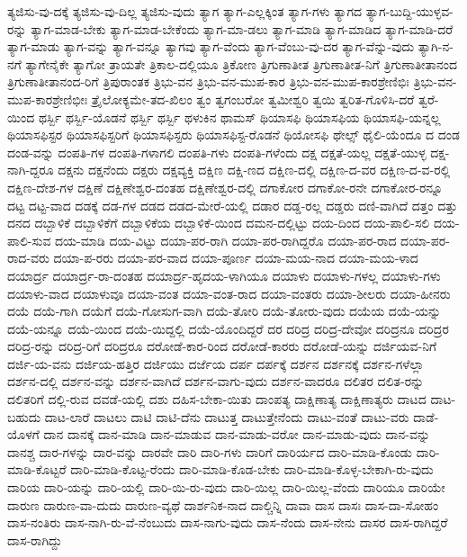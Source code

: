 {ತ್ಯಜಿಸು-ವು-ದಕ್ಕೆ
ತ್ಯಜಿಸು-ವು-ದಿಲ್ಲ
ತ್ಯಜಿಸು-ವುದು
ತ್ಯಾಗ
ತ್ಯಾಗ-ಎಲ್ಲಕ್ಕಿಂತ
ತ್ಯಾಗ-ಗಳು
ತ್ಯಾಗದ
ತ್ಯಾಗ-ಬುದ್ದಿ-ಯುಳ್ಳವ-ರನ್ನು
ತ್ಯಾಗ-ಮಾಡ-ಬೇಕು
ತ್ಯಾಗ-ಮಾಡ-ಬೇಕೆಂದು
ತ್ಯಾಗ-ಮಾ-ಡಲು
ತ್ಯಾಗ-ಮಾಡಿ
ತ್ಯಾಗ-ಮಾಡಿದ
ತ್ಯಾಗ-ಮಾಡಿ-ದರೆ
ತ್ಯಾಗ-ಮಾಡು
ತ್ಯಾಗ-ವನ್ನು
ತ್ಯಾಗ-ವನ್ನೂ
ತ್ಯಾಗವು
ತ್ಯಾಗ-ವೆಂದು
ತ್ಯಾಗ-ವೆಂಬು-ವು-ದರ
ತ್ಯಾಗ-ವೆನ್ನು-ವುದು
ತ್ಯಾಗಿ-ನ-ನಗೆ
ತ್ಯಾಗೇನೈಕೇ
ತ್ಯಾಗೋ
ತ್ರಾಯತೇ
ತ್ರಿಕಾಲ-ದಲ್ಲಿಯೂ
ತ್ರಿಕೋಣ
ತ್ರಿಗುಣಾತೀತ
ತ್ರಿಗುಣಾತೀತ-ನಿಗೆ
ತ್ರಿಗುಣಾತೀತಾನಂದ
ತ್ರಿಗುಣಾತೀತಾನಂದ-ರಿಗೆ
ತ್ರಿಪುರಾಂತಕ
ತ್ರಿಭು-ವನ
ತ್ರಿಭು-ವನ-ಮುಪ-ಕಾರ
ತ್ರಿಭು-ವನ-ಮುಪ-ಕಾರಶ್ರೇಣಿಭಿಃ
ತ್ರಿಭು-ವನ-ಮುಪ-ಕಾರಶ್ರೇಣಿಭೀಃ
ತ್ರೈಲೋಕ್ಯಮೇ-ತದ-ಖಿಲಂ
ತ್ವಂ
ತ್ವಗಂಬರೋ
ತ್ವಮೀಶ್ವರಿ
ತ್ವಯಿ
ತ್ವರಿತ-ಗೊಳಿಸಿ-ದರೆ
ತ್ವರೆ-ಯಿಂದ
ಥರ್ಸ್ಬಿ
ಥರ್ಸ್ಬಿ-ಯೊಡನೆ
ಥರ್ಸ್ಬಿ
ಥರ್ಸ್ಬಿ
ಥಳುಕಿನ
ಥಾಮಸ್
ಥಿಯಾಸಫಿ
ಥಿಯಾಸಫಿಯ
ಥಿಯಾಸಫಿ-ಯನ್ನಲ್ಲ
ಥಿಯಾಸಫಿಸ್ಟರ
ಥಿಯಾಸಫಿಸ್ಟರಿಗೆ
ಥಿಯಾಸಫಿಸ್ಟರು
ಥಿಯಾಸಫಿಸ್ಟ-ರೊಡನೆ
ಥಿಯೋಸಫಿ
ಥೇಲ್ಸ್
ಥೈಲಿ-ಯೆಂದೂ
ದ
ದಂಡ
ದಂಡ-ವನ್ನು
ದಂಪತಿ-ಗಳ
ದಂಪತಿ-ಗಳಾಗಲಿ
ದಂಪತಿ-ಗಳು
ದಂಪತಿ-ಗಳೆಂದು
ದಕ್ಷ
ದಕ್ಷತೆ-ಯಲ್ಲ
ದಕ್ಷತೆ-ಯುಳ್ಳ
ದಕ್ಷ-ನಾಗಿ-ದ್ದರೂ
ದಕ್ಷನು
ದಕ್ಷನೆಂದು
ದಕ್ಷರು
ದಕ್ಷವ್ಯಕ್ತಿ
ದಕ್ಷಿಣ
ದಕ್ಷಿ-ಣದ
ದಕ್ಷಿಣ-ದಲ್ಲಿ
ದಕ್ಷಿಣ-ದ-ವರ
ದಕ್ಷಿಣ-ದ-ವ-ರಲ್ಲಿ
ದಕ್ಷಿಣ-ದೇಶ-ಗಳ
ದಕ್ಷಿಣೆ
ದಕ್ಷಿಣೇಶ್ವರ-ದಂತಹ
ದಕ್ಷಿಣೇಶ್ವರ-ದಲ್ಲಿ
ದಗಾಕೋರ
ದಗಾಕೋ-ರನೇ
ದಗಾಕೋರ-ರನ್ನೂ
ದಟ್ಟ
ದಟ್ಟ-ವಾದ
ದಡಕ್ಕೆ
ದಡ-ಗಳ
ದಡದ
ದಡದ-ಮೇರೆ-ಯಲ್ಲಿ
ದಡಾರ
ದಡ್ಡ-ರಲ್ಲ
ದಡ್ಡರು
ದಣಿ-ವಾಗಿದೆ
ದತ್ತಂ
ದತ್ತು
ದನದ
ದಬ್ಬಾಳಿಕೆ
ದಬ್ಬಾಳಿಕೆಗೆ
ದಬ್ಬಾಳಿಕೆಯ
ದಬ್ಬಾಳಿಕೆ-ಯಿಂದ
ದಮನ-ದಲ್ಲಿಟ್ಟು
ದಯ-ದಿಂದ
ದಯ-ಪಾಲಿ-ಸಲಿ
ದಯ-ಪಾಲಿ-ಸುವ
ದಯ-ಮಾಡಿ
ದಯ-ವಿಟ್ಟು
ದಯಾ-ಪರ-ರಾಗಿ
ದಯಾ-ಪರ-ರಾಗಿದ್ದರೊ
ದಯಾ-ಪರ-ರಾದ
ದಯಾ-ಪರ-ರಾದ-ವರು
ದಯಾ-ಪ-ರರು
ದಯಾ-ಪರ-ವಾದ
ದಯಾ-ಪೂರ್ಣ
ದಯಾ-ಮಯ-ನಾದ
ದಯಾ-ಮಯ-ಳಾದ
ದಯಾರ್ದ್ರ
ದಯಾರ್ದ್ರ-ರಾ-ದಂತಹ
ದಯಾರ್ದ್ರ-ಹೃದಯ-ಳಾಗಿಯೂ
ದಯಾಳು
ದಯಾಳು-ಗಳಲ್ಲ
ದಯಾಳು-ಗಳು
ದಯಾಳು-ವಾದ
ದಯಾಳುವೂ
ದಯಾ-ವಂತ
ದಯಾ-ವಂತ-ರಾದ
ದಯಾ-ವಂತರು
ದಯಾ-ಶೀಲರು
ದಯಾ-ಹೀನರು
ದಯೆ
ದಯೆ-ಗಾಗಿ
ದಯೆಗೆ
ದಯೆ-ಗೋಸುಗ-ವಾಗಿ
ದಯೆ-ತೋರಿ
ದಯೆ-ತೋರು-ವುದು
ದಯೆಯ
ದಯೆ-ಯನ್ನು
ದಯೆ-ಯನ್ನೂ
ದಯೆ-ಯಿಂದ
ದಯೆ-ಯಿದ್ದಲ್ಲಿ
ದಯೆ-ಯೊಂದಿದ್ದರೆ
ದರ
ದರಿದ್ರ
ದರಿದ್ರ-ದೇವೋ
ದರಿದ್ರನೂ
ದರಿದ್ರರ
ದರಿದ್ರ-ರನ್ನು
ದರಿದ್ರ-ರಿಗೆ
ದರಿದ್ರರೂ
ದರೋಡೆ-ಕಾರ-ರಿಂದ
ದರೋಡೆ-ಕಾರರು
ದರೋಡೆ-ಯನ್ನು
ದರ್ಜಿಯವ-ನಿಗೆ
ದರ್ಜಿ-ಯ-ವನು
ದರ್ಜಿಯ-ಹತ್ತಿರ
ದರ್ಜಿಯು
ದರ್ಜೆಯ
ದರ್ಪ
ದರ್ಪಕ್ಕೆ
ದರ್ಶನ
ದರ್ಶನಕ್ಕೆ
ದರ್ಶನ-ಗಳೆಲ್ಲಾ
ದರ್ಶನ-ದಲ್ಲಿ
ದರ್ಶನ-ವನ್ನು
ದರ್ಶನ-ವಾಗಿದೆ
ದರ್ಶನ-ವಾಗು-ವುದು
ದರ್ಶನ-ವಾದರೂ
ದಲಿತರ
ದಲಿತ-ರನ್ನು
ದಲಿತರಿಗೆ
ದಲ್ಲಿ-ರುವ
ದವಡೆ-ಯಲ್ಲಿ
ದಶು
ದಹಿಸ-ಬೇಕಾ-ಯಿತು
ದಾಂಪತ್ಯ
ದಾಕ್ಷಿಣಾತ್ಯ
ದಾಕ್ಷಿಣಾತ್ಯರು
ದಾಟದ
ದಾಟ-ಬಹುದು
ದಾಟ-ಲಾರೆ
ದಾಟಲು
ದಾಟಿ
ದಾಟಿ-ದೆನು
ದಾಟುತ್ತ
ದಾಟುತ್ತೇನೆಂದು
ದಾಟು-ವಂತೆ
ದಾಟು-ವರು
ದಾಡೆ-ಯೊಳಗೆ
ದಾನ
ದಾನಕ್ಕೆ
ದಾನ-ಮಾಡಿ
ದಾನ-ಮಾಡುವ
ದಾನ-ಮಾಡು-ವರೋ
ದಾನ-ಮಾಡು-ವುದು
ದಾನ-ವನ್ನು
ದಾನಶ್ಚ
ದಾರ-ಗಳನ್ನು
ದಾರ-ವನ್ನು
ದಾರವೇ
ದಾರಿ
ದಾರಿ-ಗಳು
ದಾರಿಗೆ
ದಾರಿರ್ಯದ
ದಾರಿ-ಮಾಡಿ-ಕೊಂಡು
ದಾರಿ-ಮಾಡಿ-ಕೊಟ್ಟರೆ
ದಾರಿ-ಮಾಡಿ-ಕೊಟ್ಟ-ರೆಂದು
ದಾರಿ-ಮಾಡಿ-ಕೊಡ-ಬೇಕು
ದಾರಿ-ಮಾಡಿ-ಕೊಳ್ಳ-ಬೇಕಾಗಿ-ರು-ವುದು
ದಾರಿಯ
ದಾರಿ-ಯನ್ನು
ದಾರಿ-ಯಲ್ಲಿ
ದಾರಿ-ಯಿ-ರು-ವುದು
ದಾರಿ-ಯಿಲ್ಲ
ದಾರಿ-ಯಿಲ್ಲ-ವೆಂದು
ದಾರಿಯೂ
ದಾರಿಯೇ
ದಾರುಣ
ದಾರುಣ-ವಾ-ದುದು
ದಾರುಣ-ವ್ಯಥೆ
ದಾರ್ಶನಿಕ-ನಾದ
ದಾಲ್ಚಿನ್ನಿ
ದಾವಾ
ದಾಸ
ದಾಸಃ
ದಾಸ-ದಾ-ಸೋಹಂ
ದಾಸ-ನಂತಿರು
ದಾಸ-ನಾಗಿ-ರು-ವೆ-ನೆಂಬುದು
ದಾಸ-ನಾಗು-ವುದು
ದಾಸ-ನೆಂದು
ದಾಸ-ನೇನು
ದಾಸರ
ದಾಸ-ರಾಗಿದ್ದರೆ
ದಾಸ-ರಾಗಿದ್ದು
}
